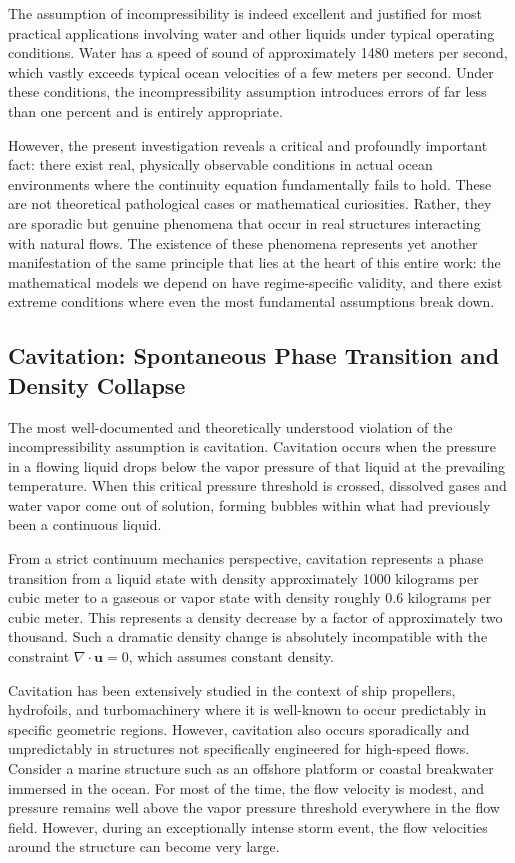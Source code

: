 ﻿\documentclass[a4paper,11pt]{article}
\theoremstyle{definition}
\begin{document}
The assumption of incompressibility is indeed excellent and justified for most practical applications involving water and other liquids under typical operating conditions. Water has a speed of sound of approximately 1480 meters per second, which vastly exceeds typical ocean velocities of a few meters per second. Under these conditions, the incompressibility assumption introduces errors of far less than one percent and is entirely appropriate.

However, the present investigation reveals a critical and profoundly important fact: there exist real, physically observable conditions in actual ocean environments where the continuity equation fundamentally fails to hold. These are not theoretical pathological cases or mathematical curiosities. Rather, they are sporadic but genuine phenomena that occur in real structures interacting with natural flows. The existence of these phenomena represents yet another manifestation of the same principle that lies at the heart of this entire work: the mathematical models we depend on have regime-specific validity, and there exist extreme conditions where even the most fundamental assumptions break down.

\subsection{Cavitation: Spontaneous Phase Transition and Density Collapse}

The most well-documented and theoretically understood violation of the incompressibility assumption is cavitation. Cavitation occurs when the pressure in a flowing liquid drops below the vapor pressure of that liquid at the prevailing temperature. When this critical pressure threshold is crossed, dissolved gases and water vapor come out of solution, forming bubbles within what had previously been a continuous liquid.

From a strict continuum mechanics perspective, cavitation represents a phase transition from a liquid state with density approximately 1000 kilograms per cubic meter to a gaseous or vapor state with density roughly 0.6 kilograms per cubic meter. This represents a density decrease by a factor of approximately two thousand. Such a dramatic density change is absolutely incompatible with the constraint $\nabla \cdot \mathbf{u} = 0$, which assumes constant density.

Cavitation has been extensively studied in the context of ship propellers, hydrofoils, and turbomachinery where it is well-known to occur predictably in specific geometric regions. However, cavitation also occurs sporadically and unpredictably in structures not specifically engineered for high-speed flows. Consider a marine structure such as an offshore platform or coastal breakwater immersed in the ocean. For most of the time, the flow velocity is modest, and pressure remains well above the vapor pressure threshold everywhere in the flow field. However, during an exceptionally intense storm event, the flow velocities around the structure can become very large.
\end{document}
